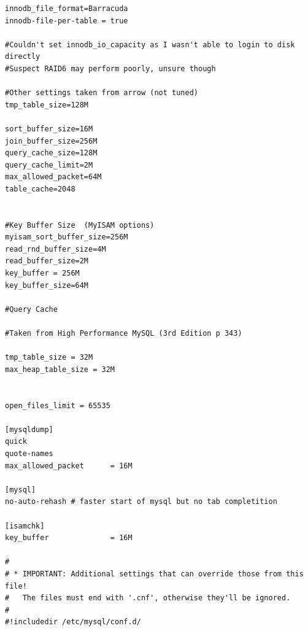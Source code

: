 \documentclass[11pt,letterpaper,oneside]{article}
\begin{document}
\begin{verbatim}
innodb_file_format=Barracuda
innodb-file-per-table = true

#Couldn't set innodb_io_capacity as I wasn't able to login to disk directly
#Suspect RAID6 may perform poorly, unsure though

#Other settings taken from arrow (not tuned)
tmp_table_size=128M

sort_buffer_size=16M
join_buffer_size=256M
query_cache_size=128M
query_cache_limit=2M
max_allowed_packet=64M
table_cache=2048


#Key Buffer Size  (MyISAM options)
myisam_sort_buffer_size=256M
read_rnd_buffer_size=4M
read_buffer_size=2M
key_buffer = 256M
key_buffer_size=64M

#Query Cache 

#Taken from High Performance MySQL (3rd Edition p 343)

tmp_table_size = 32M
max_heap_table_size = 32M


open_files_limit = 65535

[mysqldump]
quick
quote-names
max_allowed_packet      = 16M

[mysql]
no-auto-rehash # faster start of mysql but no tab completition

[isamchk]
key_buffer              = 16M

#
# * IMPORTANT: Additional settings that can override those from this file!
#   The files must end with '.cnf', otherwise they'll be ignored.
#
#!includedir /etc/mysql/conf.d/

\end{verbatim}






\renewcommand{\bibsection}{\section{References}}


\end{document}
